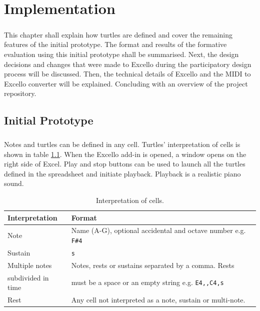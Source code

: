 
\chapter{Implementation}

\paragraph{} This chapter shall explain how turtles are defined and cover the remaining features of the initial prototype. The format and results of the formative evaluation using this initial prototype shall be summarised. Next, the design decisions and changes that were made to Excello during the participatory design process will be discussed. Then, the technical details of Excello and the MIDI to Excello converter will be explained. Concluding with an overview of the project repository.

\section{Initial Prototype}

\paragraph{} Notes and turtles can be defined in any cell. Turtles' interpretation of cells is shown in table \ref{tab:cells}. When the Excello add-in is opened, a window opens on the right side of Excel. Play and stop buttons can be used to launch all the turtles defined in the spreadsheet and initiate playback. Playback is a realistic piano sound.

\begin{table}[htb]
\centering
\vspace{1pt}
\begin{tabular}{|l|l|} \hline
\textbf{Interpretation}&\textbf{Format}\\ \hline
Note& Name (A-G), optional accidental and octave number e.g. \texttt{F\#4}\\ \hline
Sustain& \texttt{s}\\ \hline
Multiple notes& Notes, rests or sustains separated by a comma. Rests \\
subdivided in time& must be a space or an empty string e.g. \texttt{E4,,C4,s}\\ \hline
Rest& Any cell not interpreted as a note, sustain or multi-note. \\ \hline
\end{tabular}
\label{tab:cells}
\caption{Interpretation of cells.}
\end{table}

